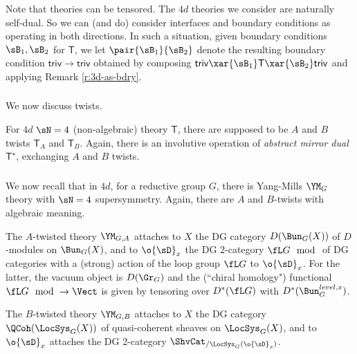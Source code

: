 \begin{rem}
\notready

Note that theories can be tensored. The $4d$ theories we consider are naturally
self-dual. So we can (and do) consider interfaces and boundary conditions as
operating in both directions. In such a situation, given boundary conditions
$\sB_1,\sB_2$ for $\mathsf{T}$, we let $\pair{\sB_1}{\sB_2}$ denote
the resulting boundary condition $\mathsf{triv} \to \mathsf{triv}$
obtained by composing $\mathsf{triv} \xar{\sB_1} \mathsf{T} \xar{\sB_2} \mathsf{triv}$
and applying Remark \ref{r:3d-as-bdry}.

\end{rem}


\subsubsection{}

We now discuss twists.

For $4d$ $\sN = 4$ (non-algebraic) theory $\mathsf{T}$, there are supposed
to be $A$ and $B$ twists $\mathsf{T}_A$ and $\mathsf{T}_B$.
Again, there is an involutive operation of
\emph{abstract mirror dual} $\mathsf{T}^{\star}$, exchanging $A$ and $B$ twists.


\subsubsection{}

We now recall that in $4d$, for a reductive group $G$,
there is Yang-Mills $\YM_G$ theory with $\sN = 4$
supersymmetry. Again, there are $A$ and $B$-twists with algebraic
meaning.

\begin{example}
\notready

The $A$-twisted theory $\YM_{G,A}$ attaches to $X$ the DG category
$D(\Bun_G(X))$ of $D$-modules on $\Bun_G(X)$, and to $\o{\sD}_x$
the DG 2-category $\fL G\mod$ of DG categories with a (strong)
action of the loop group $\fL G$ to $\o{\sD}_x$.
For the latter, the vacuum object is $D(\Gr_G)$ and the (``chiral homology")
functional $\fL G\mod \to \Vect$ is given by tensoring over $D^*(\fL G)$ with
$D^*(\Bun_G^{level,x})$.

\end{example}

\begin{example}
\notready

The $B$-twisted theory $\YM_{G,B}$ attaches to $X$ the DG category
$\QCoh(\LocSys_G(X))$ of quasi-coherent sheaves on
$\LocSys_G(X)$, and to $\o{\sD}_x$ attaches
the DG 2-category $\ShvCat_{/\LocSys_{G}(\o{\sD}_x)}$.

\end{example}

